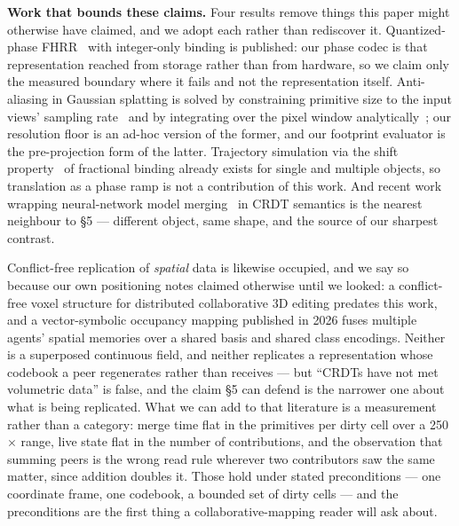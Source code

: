 \documentclass[11pt]{article}
\begin{document}
\textbf{Work that bounds these claims.} Four results remove things this
paper might otherwise have claimed, and we adopt each rather than
rediscover it. Quantized-phase FHRR~\cite{snyder2026qfhrr} with
integer-only binding is published: our phase codec is that
representation reached from storage rather than from hardware, so we
claim only the measured boundary where it fails and not the
representation itself. Anti-aliasing in Gaussian splatting is solved by
constraining primitive size to the input views' sampling
rate~\cite{yu2024mipsplatting} and by integrating over the pixel window
analytically~\cite{liang2024analytic}; our resolution floor is an ad-hoc
version of the former, and our footprint evaluator is the pre-projection
form of the latter. Trajectory simulation via the shift
property~\cite{voelker2021ssp} of fractional binding already exists for
single and multiple objects, so translation as a phase ramp is not a
contribution of this work. And recent work wrapping neural-network model
merging~\cite{gillespie2026crdtmerge} in CRDT semantics is the nearest
neighbour to \S5 --- different object, same shape, and the source of our
sharpest contrast.

Conflict-free replication of \emph{spatial} data is likewise occupied,
and we say so because our own positioning notes claimed otherwise until
we looked: a conflict-free voxel structure for distributed collaborative
3D editing predates this work, and a vector-symbolic occupancy mapping
published in 2026 fuses multiple agents' spatial memories over a shared
basis and shared class encodings. Neither is a superposed continuous
field, and neither replicates a representation whose codebook a peer
regenerates rather than receives --- but ``CRDTs have not met volumetric
data'' is false, and the claim \S5 can defend is the narrower one about
what is being replicated. What we can add to that literature is a
measurement rather than a category: merge time flat in the primitives
per dirty cell over a 250$\times$ range, live state flat in the number
of contributions, and the observation that summing peers is the wrong
read rule wherever two contributors saw the same matter, since addition
doubles it. Those hold under stated preconditions --- one coordinate
frame, one codebook, a bounded set of dirty cells --- and the
preconditions are the first thing a collaborative-mapping reader will
ask about.
\end{document}
